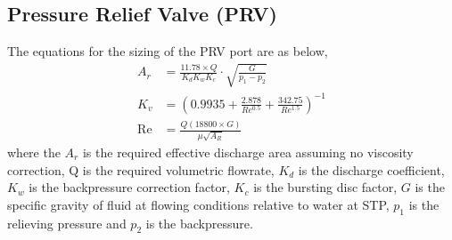 \begin{table}[h]
\centering
\caption{Cooling water sources for R101}
\label{tab:cwtable}
\end{table}

\subsection{Pressure Relief Valve (PRV)}
\label{app:PRV}
The equations for the sizing of the PRV port are as below,
\begin{align}
    A_r &= \frac{11.78 \times Q}{K_d K_w K_c} \cdot \sqrt{\frac{G}{p_1-p_2}} \\
    K_v &= (0.9935 + \frac{2.878}{Re^{0.5}} + \frac{342.75}{Re^{1.5}})^{-1} \\
    \mathrm{Re} &= \frac{Q(18800 \times G)}{\mu \sqrt{A_R}}
\end{align}
where the $A_r$ is the required effective discharge area assuming no viscosity correction, Q is the required volumetric flowrate, $K_d$ is the discharge coefficient, $K_w$ is the backpressure correction factor, $K_c$ is the bursting disc factor, $G$ is the specific gravity of fluid at flowing conditions relative to water at STP, $p_1$ is the relieving pressure and $p_2$ is the backpressure. 
